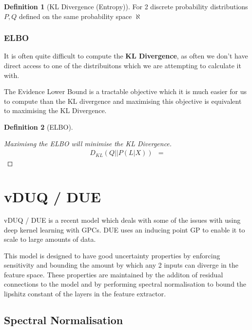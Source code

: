 \documentclass[12pt, a4paper]{report}
\theoremstyle{definition}
\newtheorem{definition}{Definition}[section]
\newtheorem{proof}{Proof}[section]
\begin{document}
\begin{definition}[KL Divergence (Entropy)]
    For 2 discrete probability distributions $P, Q$ defined on the same probability space $\aleph$
\end{definition}

\subsection{ELBO}

It is often quite difficult to compute the \textbf{KL Divergence}, as often we don't have direct access to one of the distribuitons which we are attempting to calculate it with.

The Evidence Lower Bound is a tractable objective which it is much easier for us to compute than the KL divergence and maximising this objective is equivalent to maximising the KL Divergence.

\begin{definition}[ELBO]
    
\end{definition}


\begin{proof}[Maximisng the ELBO will minimise the KL Divergence]
    \begin{align*}
        D_{KL} \left( Q || P \left(L | X\right) \right) &= 
    \end{align*}
\end{proof}


\chapter{vDUQ / DUE}

vDUQ / DUE \cite{vanamersfoort2020uncertainty} is a recent model which deals with some of the issues with using deep kernel learning with GPCs. DUE uses an inducing point GP to enable it to scale to large amounts of data.

This model is designed to have good uncertainty properties by enforcing sensitivity and bounding the amount by which any 2 inputs can diverge in the feature space. These properties are maintained by the additon of residual connections to the model and by performing spectral normalisation to bound the lipshitz constant of the layers in the feature extractor.

\section{Spectral Normalisation}
\end{document}
